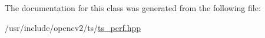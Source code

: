 

The documentation for this class was generated from the following file\-:\begin{DoxyCompactItemize}
\item 
/usr/include/opencv2/ts/\hyperlink{ts__perf_8hpp}{ts\-\_\-perf.\-hpp}\end{DoxyCompactItemize}
